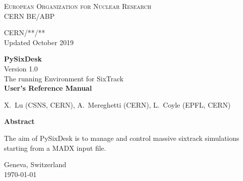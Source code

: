 \begin{titlepage}
\begin{center}\normalsize\scshape
    European Organization for Nuclear Research \\
    CERN BE/ABP
\end{center}
\vspace*{2mm}
\begin{flushright}
    CERN/**/** \\
    Updated October 2019
\end{flushright}
\begin{center}\Huge
    \textbf{PySixDesk} \\
    \LARGE Version 1.0 \\
    \vspace*{8mm}The running Environment for SixTrack \\
    \vspace*{8mm}\textbf{User's Reference Manual}
\end{center}
\begin{center}
    X.~Lu (CSNS, CERN),
    A.~Mereghetti (CERN),
    L.~Coyle (EPFL, CERN)
\end{center}
\begin{center}\large
    \vspace*{10mm}\textbf{Abstract} \\
\end{center}
The aim of PySixDesk is to manage and control massive sixtrack simulations starting from a MADX input file. 

\vfill
\begin{center}
    Geneva, Switzerland \\
    \today
\end{center}

\end{titlepage}
